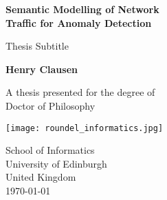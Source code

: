 \begin{titlepage}
   \begin{center}
       \vspace*{1cm}
 		\Huge
       \textbf{Semantic Modelling of Network \\Traffic for Anomaly Detection}
       
		\LARGE
       \vspace{0.5cm}
        Thesis Subtitle
            
       \vspace{1.5cm}

       \textbf{Henry Clausen}

\BgThispage
       \vfill
            
       A thesis presented for the degree of\\
       Doctor of Philosophy
            
       \vspace{0.8cm}
     


\texttt{[image: roundel\_informatics.jpg]}
            
School of Informatics\\
University of Edinburgh\\
United Kingdom\\
\today
            
   \end{center}
\end{titlepage}